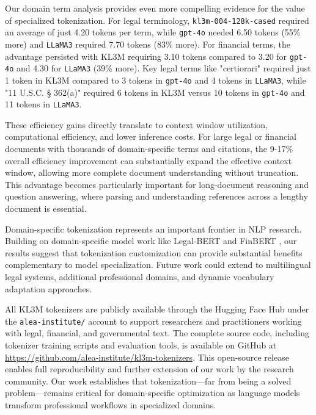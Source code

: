 Our domain term analysis provides even more compelling evidence for the value of specialized tokenization. For legal terminology, \texttt{kl3m-004-128k-cased} required an average of just 4.20 tokens per term, while \texttt{gpt-4o} needed 6.50 tokens (55\% more) and \texttt{LLaMA3} required 7.70 tokens (83\% more). For financial terms, the advantage persisted with KL3M requiring 3.10 tokens compared to 3.20 for \texttt{gpt-4o} and 4.30 for \texttt{LLaMA3} (39\% more). Key legal terms like "certiorari" required just 1 token in KL3M compared to 3 tokens in \texttt{gpt-4o} and 4 tokens in \texttt{LLaMA3}, while "11 U.S.C. § 362(a)" required 6 tokens in KL3M versus 10 tokens in \texttt{gpt-4o} and 11 tokens in \texttt{LLaMA3}.

These efficiency gains directly translate to context window utilization, computational efficiency, and lower inference costs. For large legal or financial documents with thousands of domain-specific terms and citations, the 9-17\% overall efficiency improvement can substantially expand the effective context window, allowing more complete document understanding without truncation. This advantage becomes particularly important for long-document reasoning and question answering, where parsing and understanding references across a lengthy document is essential.

Domain-specific tokenization represents an important frontier in NLP research. Building on domain-specific model work like Legal-BERT \cite{chalkidis2020legal} and FinBERT \cite{araci2019finbert}, our results suggest that tokenization customization can provide substantial benefits complementary to model specialization. Future work could extend to multilingual legal systems, additional professional domains, and dynamic vocabulary adaptation approaches.

All KL3M tokenizers are publicly available through the Hugging Face Hub under the \texttt{alea-institute/} account to support researchers and practitioners working with legal, financial, and governmental text. The complete source code, including tokenizer training scripts and evaluation tools, is available on GitHub at \url{https://github.com/alea-institute/kl3m-tokenizers}. This open-source release enables full reproducibility and further extension of our work by the research community. Our work establishes that tokenization—far from being a solved problem—remains critical for domain-specific optimization as language models transform professional workflows in specialized domains.